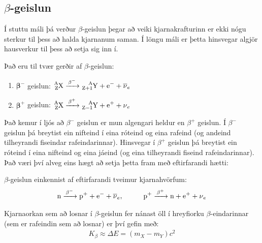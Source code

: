 \subsection{\boldmath $\beta$-geislun}

Í stuttu máli þá verður $\beta$-geislun þegar að veiki kjarnakrafturinn er ekki nógu sterkur til þess að halda kjarnanum saman. Í löngu máli er þetta hinsvegar algjör hausverkur til þess að setja sig inn í. 

\begin{tcolorbox}
\begin{definition}
Það eru til tvær gerðir af $\beta$-geislun:
\begin{enumerate}[label = \textbf{(\roman*)}]
    \item $\boldsymbol{\beta^-}$ geislun: \hspace{0.4cm} $\ce{^{A}_{Z}X ->[\beta^-] ^{A}_{Z+1}Y + e^{-} + \overline{\nu}_e}$
    \item $\boldsymbol{\beta^+}$ geislun: \hspace{0.4cm} $\ce{^{A}_{Z}X ->[\beta^+] ^{A}_{Z-1}Y + e^{+} + \nu_e}$
\end{enumerate}
\end{definition}
\end{tcolorbox}

Það kemur í ljós að $\beta^-$ geislun er mun algengari heldur en $\beta^+$ geislun. Í $\beta^-$ geislun þá breytist ein nifteind í eina róteind og eina rafeind (og andeind tilheyrandi fiseindar rafeindarinnar). Hinsvegar í $\beta^+$ geislun þá breytist ein róteind í eina nifteind og eina jáeind (og eina tilheyrandi fiseind rafeindarinnar). Það væri því alveg eins hægt að setja þetta fram með eftirfarandi hætti:

\begin{tcolorbox}
$\beta$-geislun einkennist af eftirfarandi tveimur kjarnahvörfum:
\begin{align*}
\ce{n ->[\beta^-] p^+ + e^- + \overline{\nu}_e}, \hspace{1cm} \ce{p^+ ->[\beta^+] n + e^+ + \nu_e}
\end{align*}
\end{tcolorbox}

Kjarnaorkan sem að losnar í $\beta$-geislun fer nánast öll í hreyfiorku $\beta$-eindarinnar (sem er rafeindin sem að losnar) er því gefin með:
\begin{align*}
    K_\beta \approx \Delta E = \left( m_X - m_Y \right)c^2
\end{align*}

